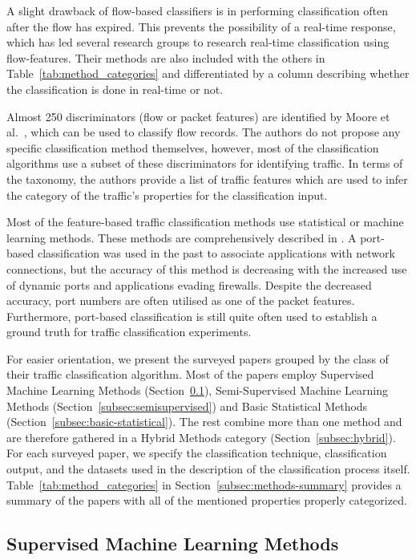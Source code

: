 A slight drawback of flow-based classifiers is in performing classification often after the flow has expired. This prevents the possibility of a real-time response, which has led several research groups to research real-time classification using flow-features. Their methods are also included with the others in Table~\ref{tab:method_categories} and differentiated by a column describing whether the classification is done in real-time or not.

Almost 250 discriminators (flow or packet features) are identified by Moore et al.~\cite{Moore-2005-Discriminators}, which can be used to classify flow records. The authors do not propose any specific classification method themselves, however, most of the classification algorithms use a subset of these discriminators for identifying traffic. In terms of the taxonomy, the authors provide a list of traffic features which are used to infer the category of the traffic's properties for the classification input.

Most of the feature-based traffic classification methods use statistical or machine learning methods. These methods are comprehensively described in \cite{Alpaydin-2010-Introduction}. A port-based classification was used in the past to associate applications with network connections, but the accuracy of this method is decreasing with the increased use of dynamic ports and applications evading firewalls. Despite the decreased accuracy, port numbers are often utilised as one of the packet features. Furthermore, port-based classification is still quite often used to establish a ground truth for traffic classification experiments.

For easier orientation, we present the surveyed papers grouped by the class of their traffic classification algorithm. Most of the papers employ Supervised Machine Learning Methods (Section~\ref{subsec:supervised}), Semi-Supervised Machine Learning Methods (Section~\ref{subsec:semisupervised}) and Basic Statistical Methods (Section~\ref{subsec:basic-statistical}). The rest combine more than one method and are therefore gathered in a Hybrid Methods category (Section~\ref{subsec:hybrid}). For each surveyed paper, we specify the classification technique, classification output, and the datasets used in the description of the classification process itself. Table~\ref{tab:method_categories} in Section~\ref{subsec:methods-summary} provides a summary of the papers with all of the mentioned properties properly categorized.

\subsection{Supervised Machine Learning Methods}\label{subsec:supervised}


